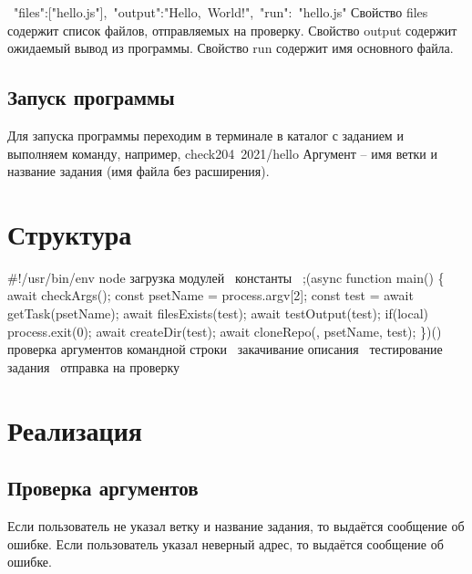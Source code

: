 {\Tt{}{\nwlbrace}\ "files":["hello.js"],\ "output":"Hello,\ World!",\ "run":\ "hello.js"{\nwrbrace}\nwendquote}
Свойство files содержит список файлов, отправляемых на проверку.
Свойство output содержит ожидаемый вывод из программы.
Свойство run содержит имя основного файла.

\subsection{Запуск программы}
Для запуска программы переходим в терминале в каталог
с заданием и выполняем команду, например,
{\Tt{}check204\ 2021/hello\nwendquote}
Аргумент -- имя ветки и название задания (имя файла без расширения).


\section{Структура}
\nwenddocs{}\endmoddef\nwstartdeflinemarkup\nwenddeflinemarkup
#!/usr/bin/env node
\LA{}загрузка модулей~{\nwtagstyle{}}\RA{}
\LA{}константы~{\nwtagstyle{}}\RA{}
;(async function main()
\{
        await checkArgs();
        const psetName = process.argv[2];
        const test = await getTask(psetName); 
        await filesExists(test);
        await testOutput(test);
        if(local)
                process.exit(0);
        await createDir(test);
        await cloneRepo(, psetName, test);
\})()
\LA{}проверка аргументов командной строки~{\nwtagstyle{}}\RA{}
\LA{}закачивание описания~{\nwtagstyle{}}\RA{}
\LA{}тестирование задания~{\nwtagstyle{}}\RA{}
\LA{}отправка на проверку~{\nwtagstyle{}}\RA{}
\nwendcode{}\nwdocspar

\section{Реализация}
\subsection{Проверка аргументов}
Если пользователь не указал ветку и название задания, 
то выдаётся сообщение об ошибке.
Если пользователь указал неверный адрес, то выдаётся сообщение об ошибке.
\nwenddocs{}\endmoddef\nwstartdeflinemarkup{}\nwenddeflinemarkup

